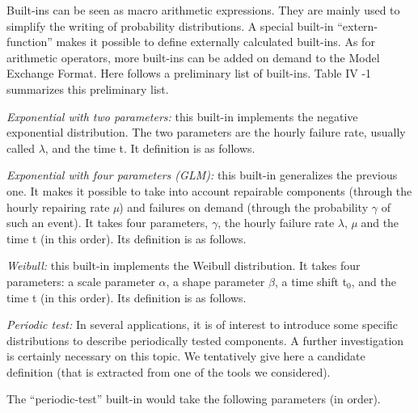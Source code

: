 \documentclass[11pt]{article}
\begin{document}
Built-ins can be seen as macro arithmetic expressions. They are mainly
used to simplify the writing of probability distributions. A special
built-in ``extern-function'' makes it possible to define externally
calculated built-ins. As for arithmetic operators, more built-ins can be
added on demand to the Model Exchange Format. Here follows a preliminary
list of built-ins. Table IV -1 summarizes this preliminary list.

\emph{Exponential with two parameters:} this built-in implements the negative
exponential distribution. The two parameters are the hourly failure
rate, usually called \(\lambda\), and the time t. It definition is as follows.

\emph{Exponential with four parameters (GLM):} this built-in generalizes the
previous one. It makes it possible to take into account repairable
components (through the hourly repairing rate \emph{µ}) and failures on
demand (through the probability \(\gamma\) of such an event). It takes four
parameters, \(\gamma\), the hourly failure rate \(\lambda\), \emph{µ} and the time t (in this
order). Its definition is as follows.

\emph{Weibull:} this built-in implements the Weibull distribution. It takes
four parameters: a scale parameter \emph{\(\alpha\)}, a shape parameter \emph{\(\beta\)}, a time
shift t\(_{\text{0}}\), and the time t (in this order). Its definition is as
follows.

\emph{Periodic test:} In several applications, it is of interest to introduce
some specific distributions to describe periodically tested components.
A further investigation is certainly necessary on this topic. We
tentatively give here a candidate definition (that is extracted from one
of the tools we considered).

The ``periodic-test'' built-in would take the following parameters (in
order).
\end{document}
